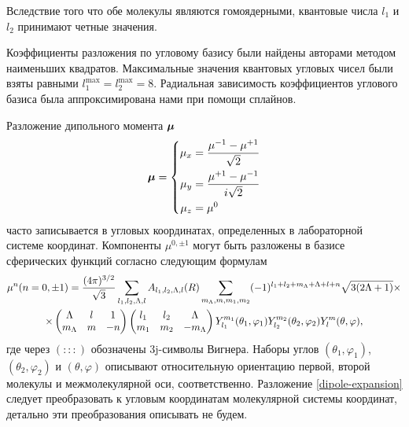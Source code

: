 Вследствие того что обе молекулы являются гомоядерными, квантовые числа $l_1$ и $l_2$ принимают четные значения. \par
Коэффициенты разложения по угловому базису были найдены авторами методом наименьших квадратов. Максимальные значения квантовых угловых чисел были взяты равными $l_1^\text{max} = l_2^\text{max} = 8$.  Радиальная зависимость коэффициентов углового базиса была аппроксимирована нами при помощи сплайнов.  \par
Разложение дипольного момента $\boldsymbol{\mu}$ 
\begin{gather}
    \boldsymbol{\mu} = \left\{
    \begin{aligned}
        \mu_x &= \frac{\mu^{-1} - \mu^{+1}}{\sqrt{2}} \\
        \mu_y &= \frac{\mu^{+1} - \mu^{-1}}{i \sqrt{2}} \\
        \mu_z &= \mu^0
    \end{aligned}
    \right.
\end{gather}
%
часто записывается в угловых координатах, определенных в лабораторной системе координат. Компоненты $\mu^{0, \pm 1}$ могут быть разложены в базисе сферических функций согласно следующим формулам \cite{hartmann2011} 
\begin{gather}
    \mu^n (n = 0, \pm 1) = \frac{( 4 \pi )^{3/2}}{\sqrt{3}} \sum_{l_1, l_2, \Lambda, l} A_{l_1, l_2, \Lambda, l}(R) \sum_{m_\Lambda, m, m_1, m_2} (-1)^{l_1 + l_2 + m_\Lambda + \Lambda + l + n} \sqrt{3 (2\Lambda + 1)} \times \notag \\
    \times
    \begin{pmatrix}
        \Lambda & l & 1 \\ m_\Lambda & m & -n 
    \end{pmatrix}
    \begin{pmatrix}
        l_1 & l_2 & \Lambda \\
        m_1 & m_2 & -m_\Lambda
    \end{pmatrix}
    Y_{l_1}^{m_1}(\theta_1, \varphi_1) Y_{l_2}^{m_2}(\theta_2, \varphi_2) Y_l^m(\theta, \varphi), \label{dipole-expansion} 
\end{gather}
%
где через $(:::)$ обозначены 3j-символы Вигнера. Наборы углов $(\theta_1, \varphi_1)$, $(\theta_2, \varphi_2)$ и $(\theta, \varphi)$ описывают относительную ориентацию первой, второй молекулы и межмолекулярной оси, соответственно. Разложение \eqref{dipole-expansion} следует преобразовать к угловым координатам молекулярной системы координат, детально эти преобразования описывать не будем. \par
